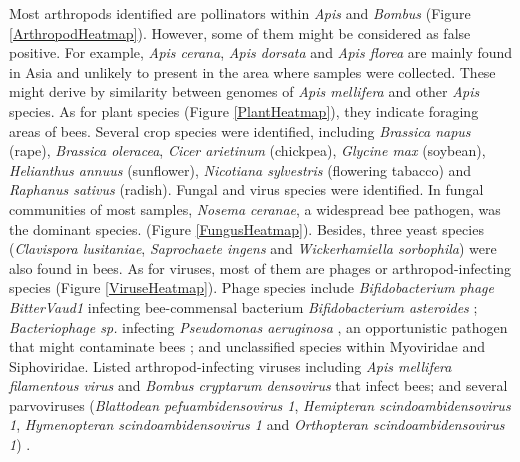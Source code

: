 \documentclass[11pt]{article}
\begin{document}
    Most arthropods identified are pollinators within \textit{Apis} and \textit{Bombus} (Figure \ref{ArthropodHeatmap}). 
    However, some of them might be considered as false positive. 
    For example, \textit{Apis cerana}, \textit{Apis dorsata} and \textit{Apis florea} are mainly found in Asia and unlikely to present in the area where samples were collected. 
    These might derive by similarity between genomes of \textit{Apis mellifera} and other \textit{Apis} species. 
    As for plant species (Figure \ref{PlantHeatmap}), they indicate foraging areas of bees. Several crop species were identified, including \textit{Brassica napus} (rape), \textit{Brassica oleracea}, \textit{Cicer arietinum} (chickpea), \textit{Glycine max} (soybean), \textit{Helianthus annuus} (sunflower), \textit{Nicotiana sylvestris} (flowering tabacco) and \textit{Raphanus sativus} (radish). 
    \newline
    Fungal and virus species were identified. 
    In fungal communities of most samples, \textit{Nosema ceranae}, a widespread bee pathogen, was the dominant species. (Figure \ref{FungusHeatmap}). 
    Besides, three yeast species (\textit{Clavispora lusitaniae}, \textit{Saprochaete ingens} and \textit{Wickerhamiella sorbophila}) were also found in bees.  
    As for viruses, most of them are phages or arthropod-infecting species (Figure \ref{ViruseHeatmap}). 
    Phage species include \textit{Bifidobacterium phage BitterVaud1} infecting bee-commensal bacterium \textit{Bifidobacterium asteroides} \citep{bonilla2020honey}; \textit{Bacteriophage sp.} infecting \textit{Pseudomonas aeruginosa} \citep{essoh2015investigation}, an opportunistic pathogen that might contaminate bees \citep{bailey1968honey,papadopoulou1992experimental,papadopoulou1993haemocyte}; and unclassified species within Myoviridae and Siphoviridae. 
    Listed arthropod-infecting viruses including \textit{Apis mellifera filamentous virus} and \textit{Bombus cryptarum densovirus} that infect bees; and several parvoviruses (\textit{Blattodean pefuambidensovirus 1}, \textit{Hemipteran scindoambidensovirus 1}, \textit{Hymenopteran scindoambidensovirus 1} and \textit{Orthopteran scindoambidensovirus 1}) \citep{penzes2020reorganizing}.
\end{document}
